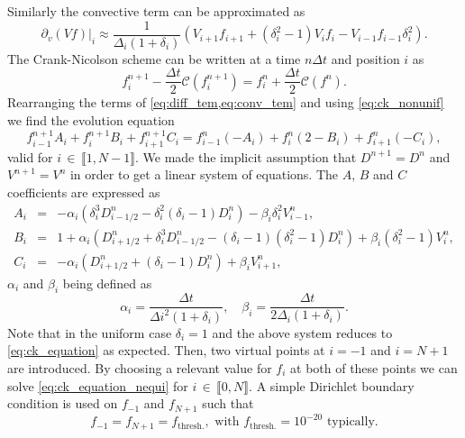 \documentclass[11pt]{article}
\begin{document}
%
Similarly the convective term can be approximated as
%
\begin{equation}\label{eq:conv_tem}
  \partial_{v}(Vf) |_i \approx \dfrac{1}{\Delta_i(1+\delta_i)} \left( V_{i+1}f_{i+1} + (\delta_i^2 -1) V_i f_i - V_{i-1} f_{i-1} \delta_i^2\right) .
\end{equation}
%
The Crank-Nicolson scheme can be written at a time $n\Delta t$ and position $i$ as
%
\begin{equation}\label{eq:ck_nonunif}
  f_i^{n+1} - \dfrac{\Delta t}{2} \mathcal{C}(f_i^{n+1}) = f_i^{n} + \dfrac{\Delta t}{2} \mathcal{C}(f^{n}).
\end{equation}
%
Rearranging the terms of \cref{eq:diff_tem,eq:conv_tem} and using \cref{eq:ck_nonunif} we find  the evolution equation
%
\begin{equation}\label{eq:ck_equation_nequi}
  f_{i-1}^{n+1} A_i + f_i^{n+1} B_i + f_{i+1}^{n+1} C_i = f_{i-1}^{n}(-A_i) + f_i^{n} (2 - B_i) + f_{i+1}^{n}(-C_i),
\end{equation}
%
valid for $i \, \in \, \llbracket 1, N-1 \rrbracket $. We made the implicit assumption that $D^{n+1} = D^{n}$ and $V^{n+1} = V^{n}$ in order to get a linear system of equations. The $A$,  $B$ and $C$ coefficients are expressed as 
%
\begin{eqnarray}
  A_i &=& - \alpha_i \left( \delta_i^3 D^{n}_{i-1/2} - \delta_i^2 (\delta_i-1) D^{n}_i\right) - \beta_i \delta_i^2V^{n}_{i-1} , \\
  B_i &=& 1  + \alpha_i \left(  D^{n}_{i+1/2}  + \delta_i^3 D^{n}_{i-1/2} - (\delta_i-1)(\delta_i^2-1) D^{n}_i \right) + \beta_i (\delta_i^2 -1) V^{n}_i, \\
  C_i &=& -\alpha_i \left( D^{n}_{i+1/2} + (\delta_i - 1)D^{n}_i \right) + \beta_i V^{n}_{i+1},
\end{eqnarray}
%
$\alpha_i$ and $\beta_i$ being defined as 
%
\begin{equation}
  \alpha_i = \dfrac{\Delta t}{\Delta i ^2 (1+\delta_i)}, \quad \beta_i = \dfrac{\Delta t}{2 \Delta_i (1 + \delta_i)}.
\end{equation}
%
Note that in the uniform case $\delta_i = 1$ and the above system reduces to \cref{eq:ck_equation} as expected. Then, two virtual points at $i=-1$ and $i=N+1$ are introduced. By choosing a relevant value for $f_i$ at both of these points we can solve \cref{eq:ck_equation_nequi} for $i \, \in \,  \llbracket 0, N \rrbracket $. A simple Dirichlet boundary condition is used on $f_{-1}$ and $f_{N+1}$ such that
%
\begin{equation}\label{eq:dirichlet_bc}
  f_{-1} = f_{N+1} = f_{\text{thresh.}}, \,\, \text{with} \,\, f_{\text{thresh.}} = 10^{-20} \,\, \text{typically}.
\end{equation}
\end{document}
